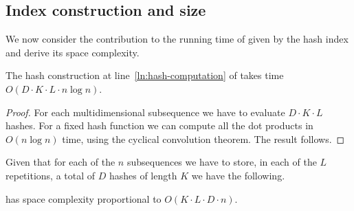 \subsection{Index construction and size}
We now consider the contribution to the running time of  given by the hash index and derive its space complexity.
\begin{lemma}
\label{lemma:line3}
    The hash construction at line~\ref{ln:hash-computation} of  takes time $O(D\cdot K \cdot L \cdot n\log n)$.
\end{lemma}
\begin{proof}
    For each multidimensional subsequence we have to evaluate $D\cdot K \cdot L$ hashes. For a fixed hash function we can compute all the dot products in $O\left(n\log n\right)$ time, using the cyclical convolution theorem. The result follows.
\end{proof}

Given that for each of the $n$ subsequences we have to store, in each of the $L$ repetitions, a total of $D$ hashes of length $K$ we have the following.
\begin{theorem}
     has space complexity proportional to $O\left(K\cdot L \cdot D\cdot n\right)$.
\end{theorem}

